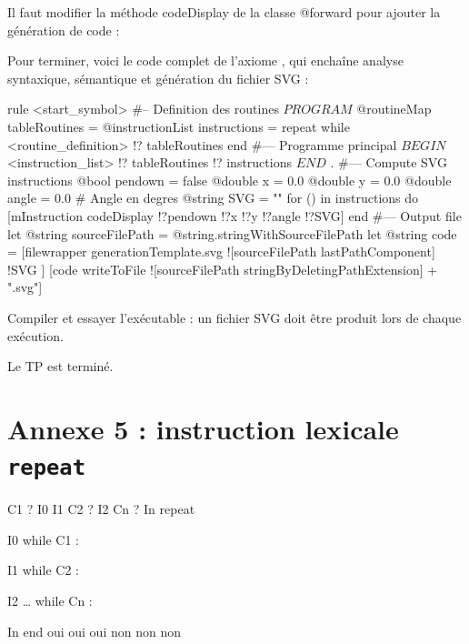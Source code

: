 Il faut modifier la méthode codeDisplay de la classe @forward pour ajouter la génération de code :


Pour terminer, voici le code complet de l’axiome , qui enchaîne analyse syntaxique, sémantique et génération du fichier SVG :
\begin{galgascode}
rule <start_symbol> {
#-- Definition des routines
  $PROGRAM$
  @routineMap tableRoutines = {}
  @instructionList instructions = {}
  repeat
  while
    <routine_definition> !? tableRoutines
  end
#--- Programme principal
  $BEGIN$
  <instruction_list> !? tableRoutines !? instructions
  $END$
  $.$
#--- Compute SVG instructions
  @bool pendown = false
  @double x = 0.0
  @double y = 0.0
  @double angle = 0.0 # Angle en degres
  @string SVG = ""
  for () in instructions do
    [mInstruction codeDisplay !?pendown !?x !?y !?angle !?SVG]
  end
#--- Output file
  let @string sourceFilePath = @string.stringWithSourceFilePath
  let @string code = [filewrapper generationTemplate.svg
    ![sourceFilePath lastPathComponent]
    !SVG
  ]
  [code writeToFile ![sourceFilePath stringByDeletingPathExtension] + ".svg"]
}
\end{galgascode}

Compiler et essayer l'exécutable : un fichier SVG doit être produit lors de chaque exécution.

Le TP est terminé.



\section {Annexe 5 : instruction lexicale \texttt{repeat}}
C1 ?
I0
I1
C2 ?
I2
Cn ?
In
repeat

I0
while C1 :

I1
while C2 :

I2
…
while Cn :

In
end
oui
oui
oui
non
non
non

